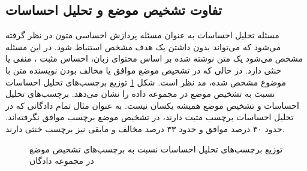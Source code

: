\subsection{تفاوت تشخیص موضع و تحلیل احساسات}
مسئله تحلیل احساسات
	به عنوان مسئله پردازش احساسی متون در نظر گرفته می‌شود که می‌تواند بدون
	داشتن یک هدف مشخص استنباط شود. در این مسئله مشخص می‌شود یک متن نوشته شده بر اساس محتوای زبان، احساس مثبت
		،
		منفی
			یا خنثی
				دارد.  در حالی که در تشخیص موضع موافق یا مخالف بودن
			نویسنده متن با موضوع مشخص شده، مد نظر است. شکل
			\ref{sem-eval-label}
توزیع برچسب‌های تحلیل احساسات نسبت به تشخیص موضع در مجموعه داده
			\cite{Sobhani2016DetectingSI}
را نشان می‌دهد. برچسب‌های تحلیل احساسات و تشخیص موضع همیشه یکسان نیست. به عنوان مثال تمام دادگانی که در تحلیل احساسات برچسب مثبت دارند، در تشخیص موضع برچسب موافق نگرفتە‌اند. حدود ۳۰ درصد موافق و حدود ۳۳ درصد مخالف و مابقی نیز برچسب خنثی دارند.
\begin{figure}[H]
	\vspace{-0.5cm}
	\caption[توزیع برچسب‌های تحلیل احساسات نسبت به برچسب‌های تشخیص موضع]{توزیع برچسب‌های تحلیل احساسات نسبت به برچسب‌های تشخیص موضع در مجموعه دادگان
	 \cite{ALDAYEL2021102597}\label{sem-eval-label}}
	
\end{figure}	




